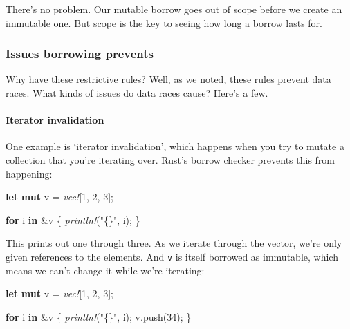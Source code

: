 \documentclass[a4paper,]{book}
\newenvironment{Shaded}{\begin{snugshade}}{\end{snugshade}}
\newcommand{\KeywordTok}[1]{\textcolor[rgb]{0.13,0.29,0.53}{\textbf{{#1}}}}
\newcommand{\DecValTok}[1]{\textcolor[rgb]{0.00,0.00,0.81}{{#1}}}
\newcommand{\StringTok}[1]{\textcolor[rgb]{0.31,0.60,0.02}{{#1}}}
\newcommand{\PreprocessorTok}[1]{\textcolor[rgb]{0.56,0.35,0.01}{\textit{{#1}}}}
\newcommand{\NormalTok}[1]{{#1}}
\let\oldparagraph\paragraph
\renewcommand{\paragraph}[1]{\oldparagraph{#1}\mbox{}}
\begin{document}
There's no problem. Our mutable borrow goes out of scope before we
create an immutable one. But scope is the key to seeing how long a
borrow lasts for.

\subsubsection{Issues borrowing
prevents}\label{issues-borrowing-prevents}

Why have these restrictive rules? Well, as we noted, these rules prevent
data races. What kinds of issues do data races cause? Here's a few.

\paragraph{Iterator invalidation}\label{iterator-invalidation}

One example is `iterator invalidation', which happens when you try to
mutate a collection that you're iterating over. Rust's borrow checker
prevents this from happening:

\begin{Shaded}
\begin{Highlighting}[]
\KeywordTok{let} \KeywordTok{mut} \NormalTok{v = }\PreprocessorTok{vec!}\NormalTok{[}\DecValTok{1}\NormalTok{, }\DecValTok{2}\NormalTok{, }\DecValTok{3}\NormalTok{];}

\KeywordTok{for} \NormalTok{i }\KeywordTok{in} \NormalTok{&v \{}
    \PreprocessorTok{println!}\NormalTok{(}\StringTok{"\{\}"}\NormalTok{, i);}
\NormalTok{\}}
\end{Highlighting}
\end{Shaded}

This prints out one through three. As we iterate through the vector,
we're only given references to the elements. And \texttt{v} is itself
borrowed as immutable, which means we can't change it while we're
iterating:

\begin{Shaded}
\begin{Highlighting}[]
\KeywordTok{let} \KeywordTok{mut} \NormalTok{v = }\PreprocessorTok{vec!}\NormalTok{[}\DecValTok{1}\NormalTok{, }\DecValTok{2}\NormalTok{, }\DecValTok{3}\NormalTok{];}

\KeywordTok{for} \NormalTok{i }\KeywordTok{in} \NormalTok{&v \{}
    \PreprocessorTok{println!}\NormalTok{(}\StringTok{"\{\}"}\NormalTok{, i);}
    \NormalTok{v.push(}\DecValTok{34}\NormalTok{);}
\NormalTok{\}}
\end{Highlighting}
\end{Shaded}
\end{document}
